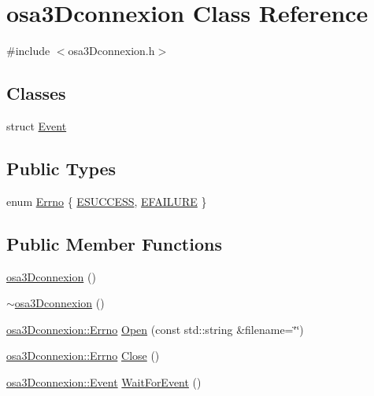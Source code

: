 \hypertarget{classosa3_dconnexion}{\section{osa3\-Dconnexion Class Reference}
\label{classosa3_dconnexion}
}


{\ttfamily \#include $<$osa3\-Dconnexion.\-h$>$}

\subsection*{Classes}
\begin{DoxyCompactItemize}
\item 
struct \hyperlink{structosa3_dconnexion_1_1_event}{Event}
\end{DoxyCompactItemize}
\subsection*{Public Types}
\begin{DoxyCompactItemize}
\item 
enum \hyperlink{classosa3_dconnexion_aec0c86f7f6c58dc95c16c3ace14a495a}{Errno} \{ \hyperlink{classosa3_dconnexion_aec0c86f7f6c58dc95c16c3ace14a495aa4ea83bf03eb3b517bbb3d17bb20b57ce}{E\-S\-U\-C\-C\-E\-S\-S}, 
\hyperlink{classosa3_dconnexion_aec0c86f7f6c58dc95c16c3ace14a495aa0c4b4fba348d2bf3bf949906b0e3be11}{E\-F\-A\-I\-L\-U\-R\-E}
 \}
\end{DoxyCompactItemize}
\subsection*{Public Member Functions}
\begin{DoxyCompactItemize}
\item 
\hyperlink{classosa3_dconnexion_a763f8eb82c7475ad4c7411975ac9a149}{osa3\-Dconnexion} ()
\item 
\hyperlink{classosa3_dconnexion_a36c20a73e42c7c79520e410debaf62fa}{$\sim$osa3\-Dconnexion} ()
\item 
\hyperlink{classosa3_dconnexion_aec0c86f7f6c58dc95c16c3ace14a495a}{osa3\-Dconnexion\-::\-Errno} \hyperlink{classosa3_dconnexion_a6e0d61c02f263a9ccb94b2d0ced470fa}{Open} (const std\-::string \&filename=\char`\"{}\char`\"{})
\item 
\hyperlink{classosa3_dconnexion_aec0c86f7f6c58dc95c16c3ace14a495a}{osa3\-Dconnexion\-::\-Errno} \hyperlink{classosa3_dconnexion_acc2b3efc3a6b621a082e48ddbc84b14a}{Close} ()
\item 
\hyperlink{structosa3_dconnexion_1_1_event}{osa3\-Dconnexion\-::\-Event} \hyperlink{classosa3_dconnexion_ac9fcd8a404949f445ab4c41c965039f1}{Wait\-For\-Event} ()
\end{DoxyCompactItemize}


